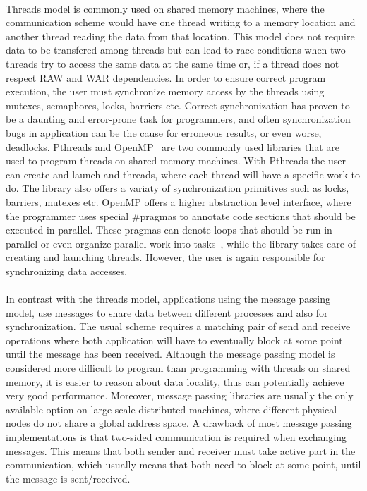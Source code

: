 \paragraph{}
Threads model is commonly used on shared memory machines, where 
the communication scheme would have one thread writing to a memory location
and another thread reading the data from that location.  This model does not require data to be
transfered among threads but can lead to race conditions when two threads try to access the same
data at the same time or, if a thread does not respect RAW and WAR dependencies. 
In order to ensure correct program execution,
the user must synchronize memory access by the threads using mutexes, semaphores, locks, barriers etc.
Correct synchronization has proven to be a daunting and error-prone task for programmers, and often 
synchronization bugs in application can be the cause for  
erroneous results, or even worse, deadlocks.  Pthreads and OpenMP~\cite{Dagum:1998:OIA:615255.615542}
 are two commonly used libraries
that are used to program threads on shared memory machines.  With Pthreads the user can create and
launch and threads, where each thread will have a specific work to do.  The library also offers 
a variaty of synchronization primitives such as locks, barriers, mutexes etc.  OpenMP offers
a higher abstraction level interface, where the programmer uses special \#pragmas to annotate
code sections that should be executed in parallel.  These pragmas can denote loops that should 
be run in parallel or even organize parallel work into tasks~\cite{Ayguade:2009:DOT:1512157.1512430},
while the library takes care of creating and launching threads.  However, the user is again responsible
for synchronizing data accesses.

\paragraph{}
In contrast with the threads model,  applications using the message passing model, use messages to share data
between different processes and also for synchronization.  The usual scheme requires a matching pair
of send and receive operations where both application will have to eventually block at some point until
the message has been received. Although the message passing model is considered more difficult to program 
than programming with threads on shared memory, it is easier to reason about data locality, thus can 
potentially achieve very good performance.  Moreover, message passing libraries are usually the only 
available option on large scale distributed machines, where different physical nodes do not share 
a global address space.  A drawback of most message passing implementations is that two-sided 
communication is required when exchanging messages.  This means that both sender and receiver must
take active part in the communication, which usually means that both need to block at some point,
until the message is sent/received.  

